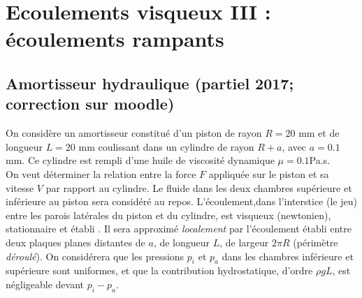 



\section{Ecoulements visqueux III : écoulements rampants}


\setcounter{subsection}{-1}

\subsection{Amortisseur hydraulique (partiel 2017; correction sur moodle)}

On consid\`ere un amortisseur constitu\'e d'un piston de rayon $R=20$ mm et de longueur $L=20$ mm coulissant dans un cylindre de rayon $R+a$, avec $a =0.1$ mm. Ce cylindre est rempli d'une huile de viscosit\'e dynamique $\mu=0.1$Pa.s.\\
On veut d\'eterminer la relation entre la force $F$ appliqu\'ee sur le piston et sa vitesse $V$ par rapport au cylindre. Le fluide dans les deux chambres sup\'erieure et inf\'erieure au piston sera consid\'er\'e au repos. L'\'ecoulement,dans l'interstice (le jeu) entre les parois lat\'erales du piston et du cylindre, est visqueux (newtonien), stationnaire et \'etabli . Il sera approxim\'e \textit{localement} par l'\'ecoulement \'etabli entre deux plaques planes distantes de $a$, de longueur $L$, de largeur $2\pi R$ (p\'erim\`etre {\it d\'eroul\'e}). On consid\'erera que les pressions $p_i$ et $p_a$ dans les chambres inf\'erieure et sup\'erieure sont uniformes, et que la contribution hydrostatique, d'ordre $\rho gL$, est n\'egligeable devant $p_i-p_a$.\\


